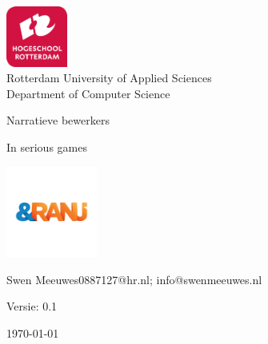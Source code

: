 \documentclass{report}
\makeatletter
\newcommand{\versionnumber}{0.1}
\newcommand{\name}{Swen Meeuwes}
\newcommand{\email}{0887127@hr.nl; info@swenmeeuwes.nl}
\newcommand{\institution}{Rotterdam University of Applied Sciences}
\renewcommand{\title}{Narratieve bewerkers}
\newcommand{\subtitle}{In serious games}
\makeatother
\begin{document}
\begin{titlepage} %
        \centering
        \includegraphics[width=2cm]{University}\\
        \institution{}\\
        Department of Computer Science
        \par
        \vspace{4\baselineskip}
        {\Huge\title\par}
        {\Large\subtitle\par}
        \par
        \includegraphics[width=3cm]{Organisation}
        \vspace{4\baselineskip}
        \par
        {\Large\name \email\par}
        \vfill
        {\hfill Versie: \versionnumber\par}
        {\hfill \today}
        \thispagestyle{empty}
\end{titlepage}




\tableofcontents




















\renewcommand{\bibname}{Literatuurlijst}
{}
\nocite{*}
\end{document}

